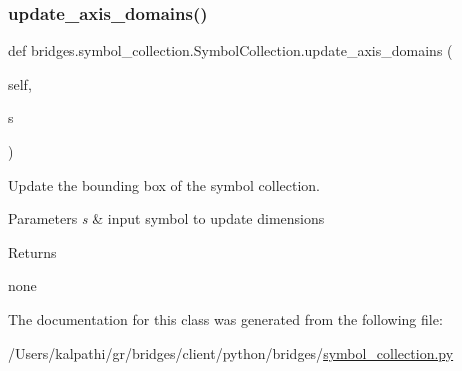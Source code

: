 \subsubsection{\texorpdfstring{update\+\_\+axis\+\_\+domains()}{update\_axis\_domains()}}
{\footnotesize\ttfamily def bridges.\+symbol\+\_\+collection.\+Symbol\+Collection.\+update\+\_\+axis\+\_\+domains (\begin{DoxyParamCaption}\item[{}]{self,  }\item[{}]{s }\end{DoxyParamCaption})}



Update the bounding box of the symbol collection. 


\begin{DoxyParams}{Parameters}
{\em s} & input symbol to update dimensions \\
\hline
\end{DoxyParams}
\begin{DoxyReturn}{Returns}


none 
\end{DoxyReturn}


The documentation for this class was generated from the following file\+:\begin{DoxyCompactItemize}
\item 
/\+Users/kalpathi/gr/bridges/client/python/bridges/\mbox{\hyperlink{symbol__collection_8py}{symbol\+\_\+collection.\+py}}\end{DoxyCompactItemize}
